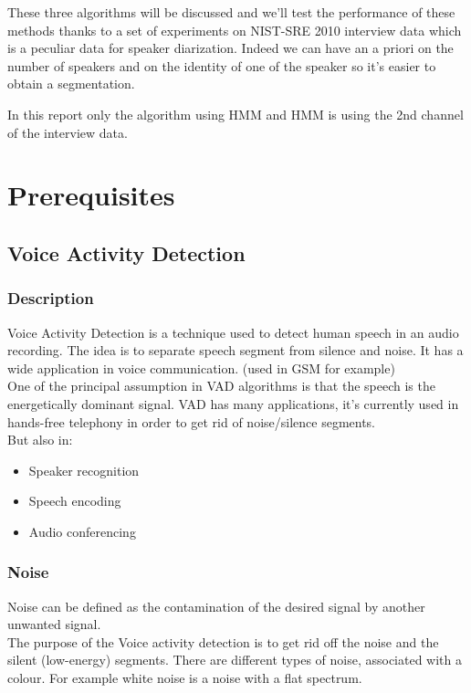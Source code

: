 \documentclass{techrep} %
\begin{document}
These three algorithms will be discussed and we'll test the performance
of these methods thanks to a set of experiments on NIST-SRE 2010
interview data which is a peculiar data for speaker
diarization. Indeed we can have an a priori on the number of speakers and
on the identity of one of the speaker so it's easier to obtain a
segmentation.

In this report only the algorithm using HMM and HMM is using the 2nd
channel of the interview data.

\chapter{Prerequisites}
\section{Voice Activity Detection}

\subsection{Description}

Voice Activity Detection is a technique used to detect human speech in
an audio recording. The idea is to separate speech segment from
silence and noise. It has a wide application in voice
communication. (used in GSM for example)\\ One of the principal
assumption in VAD algorithms is that the speech is the energetically
dominant signal. VAD has many applications, it's currently used in
hands-free telephony in order to get rid of noise/silence
segments.\\ But also in:
\begin{itemize}
\item Speaker recognition
\item Speech encoding
\item Audio conferencing
\end{itemize}

\subsection{Noise}

Noise can be defined as the contamination of the desired signal by
another unwanted signal.\\ The purpose of the Voice activity detection
is to get rid off the noise and the silent (low-energy) segments.
There are different types of noise, associated with a colour. For
example white noise is a noise with a flat spectrum.
\end{document}

